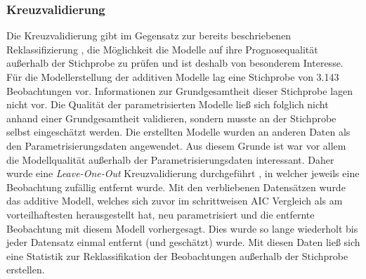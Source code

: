 \documentclass{Vorlage}
\begin{document}
\subsubsection{Kreuzvalidierung}
Die Kreuzvalidierung gibt im Gegensatz zur bereits beschriebenen Reklassifizierung , die Möglichkeit die Modelle auf ihre Prognosequalität außerhalb der Stichprobe zu prüfen und ist deshalb von besonderem Interesse.
Für die Modellerstellung der additiven Modelle lag eine Stichprobe von 3.143 Beobachtungen vor. Informationen zur Grundgesamtheit dieser Stichprobe lagen nicht vor. Die Qualität der parametrisierten Modelle ließ sich folglich nicht anhand einer Grundgesamtheit validieren, sondern musste an der Stichprobe selbst eingeschätzt werden. Die erstellten Modelle wurden an anderen Daten als den Parametrisierungsdaten angewendet. Aus diesem Grunde ist war vor allem die Modellqualität außerhalb der Parametrisierungsdaten interessant. Daher wurde eine \textit{Leave-One-Out} Kreuzvalidierung durchgeführt \cite[p. 149]{fahrmeir2013regression}, in welcher jeweils eine Beobachtung zufällig entfernt wurde. Mit den verbliebenen Datensätzen wurde das additive Modell, welches sich zuvor im schrittweisen AIC Vergleich als am vorteilhaftesten herausgestellt hat, neu parametrisiert und die entfernte Beobachtung mit diesem Modell vorhergesagt. Dies wurde so lange wiederholt bis jeder Datensatz einmal entfernt (und geschätzt) wurde. Mit diesen Daten ließ sich eine Statistik zur Reklassifikation der Beobachtungen außerhalb der Stichprobe erstellen.
\end{document}
